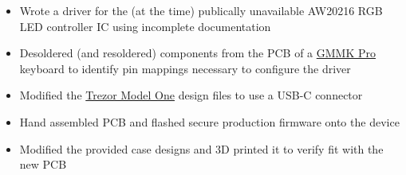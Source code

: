 \documentclass{resume}
\begin{document}
\begin{itemize}
    \item Wrote a driver for the (at the time) publically unavailable AW20216 RGB LED controller IC using incomplete documentation
    \item Desoldered (and resoldered) components from the PCB of a \href{https://www.gloriousgaming.com/products/glorious-gmmk-pro-75-barebone-black}{GMMK Pro} keyboard to identify pin mappings necessary to configure the driver
\end{itemize}

\begin{itemize}
    \item Modified the \href{https://shop.trezor.io/product/trezor-one-white}{Trezor Model One} design files to use a USB-C connector
    \item Hand assembled PCB and flashed secure production firmware onto the device
    \item Modified the provided case designs and 3D printed it to verify fit with the new PCB
\end{itemize}

\Education

\end{document}
